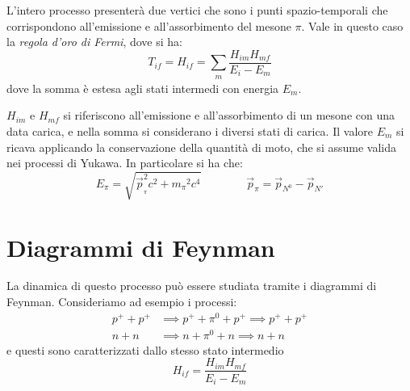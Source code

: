 L'intero processo presenterà due vertici che sono i punti spazio-temporali che
corrispondono all'emissione e all'assorbimento del mesone $\pi$. Vale in questo
caso la \textit{regola d'oro di Fermi}, dove si ha:
\begin{equation*}
T_{if} = H_{if} = \sum_{\substack{m}} \dfrac{H_{im}H_{mf}}{E_i - E_m}
\end{equation*}
dove la somma è estesa agli stati intermedi con energia $E_m$. 

$H_{im}$ e $H_{mf}$ si riferiscono all'emissione e all'assorbimento di un mesone
con una data carica, e nella somma si considerano i diversi stati di carica.
Il valore $E_m$ si ricava applicando la conservazione della quantità di moto,
che si assume valida nei processi di Yukawa. In particolare si ha che:
\begin{equation*}
E_{\pi} = \sqrt{\vec{p}_{_{\pi}}^2 c^2 + {m_{\pi}}^2 c^4} \qquad \qquad \vec{p}_{\pi} = \vec{p}_{N^0} - \vec{p}_{N'}
\end{equation*}

\section{Diagrammi di Feynman}
La dinamica di questo processo può essere studiata tramite i diagrammi di Feynman. Consideriamo ad esempio i processi:
\begin{align*}
p^+ + p^+ &\implies p^+ + \pi^0 + p^+ \implies p^+ + p^+ \\
n + n &\implies n + \pi^0 + n \implies n + n
\end{align*}
e questi sono caratterizzati dallo stesso stato intermedio
\begin{equation*}
H_{if} = \dfrac{H_{im}H_{mf}}{E_i - E_m}
\end{equation*}

